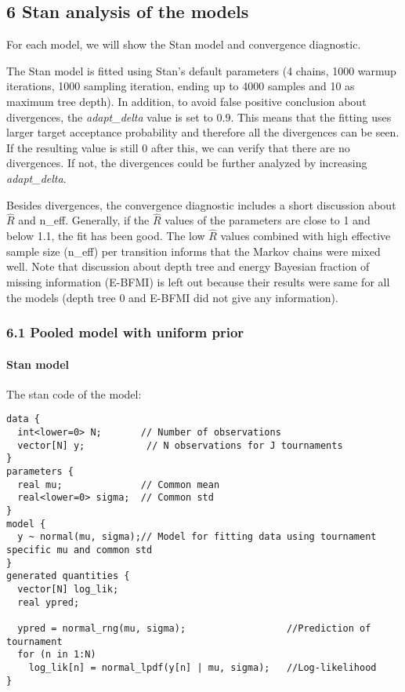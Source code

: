 \documentclass[11pt]{article}
\begin{document}
    \hypertarget{stan-analysis-of-the-models}{%
\subsection{6 Stan analysis of the
models}\label{stan-analysis-of-the-models}}

For each model, we will show the Stan model and convergence diagnostic.

The Stan model is fitted using Stan's default parameters (4 chains, 1000
warmup iterations, 1000 sampling iteration, ending up to 4000 samples
and 10 as maximum tree depth). In addition, to avoid false positive
conclusion about divergences, the \emph{adapt\_delta} value is set to
0.9. This means that the fitting uses larger target acceptance
probability and therefore all the divergences can be seen. If the
resulting value is still 0 after this, we can verify that there are no
divergences. If not, the divergences could be further analyzed by
increasing \emph{adapt\_delta}.

Besides divergences, the convergence diagnostic includes a short
discussion about \(\hat R\) and n\_eff. Generally, if the \(\hat R\)
values of the parameters are close to 1 and below 1.1, the fit has been
good. The low \(\hat R\) values combined with high effective sample size
(n\_eff) per transition informs that the Markov chains were mixed well.
Note that discussion about depth tree and energy Bayesian fraction of
missing information (E-BFMI) is left out because their results were same
for all the models (depth tree 0 and E-BFMI did not give any
information).

\hypertarget{pooled-model-with-uniform-prior}{%
\subsubsection{6.1 Pooled model with uniform
prior}\label{pooled-model-with-uniform-prior}}

\hypertarget{stan-model}{%
\paragraph{Stan model}\label{stan-model}}

The stan code of the model:

\begin{verbatim}
data {
  int<lower=0> N;       // Number of observations
  vector[N] y;           // N observations for J tournaments
}
parameters {
  real mu;              // Common mean
  real<lower=0> sigma;  // Common std
}
model {
  y ~ normal(mu, sigma);// Model for fitting data using tournament specific mu and common std
}
generated quantities {
  vector[N] log_lik;
  real ypred;
  
  ypred = normal_rng(mu, sigma);                  //Prediction of tournament
  for (n in 1:N)
    log_lik[n] = normal_lpdf(y[n] | mu, sigma);   //Log-likelihood
}
\end{verbatim}
\end{document}
